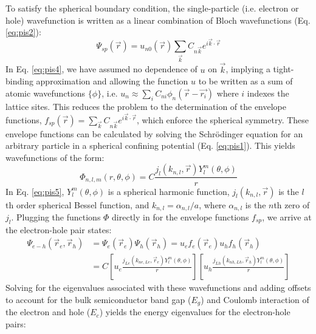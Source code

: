 To satisfy the spherical boundary condition, the single-particle (i.e. electron or hole) wavefunction is written as a linear combination of Bloch wavefunctions (Eq. \ref{eq:pis2}):
\begin{equation}\label{eq:pis4}
\Psi_{sp}\left(\vec{r}\right) = u_{n0}\left(\vec{r}\right)\sum_{\vec{k}}C_{n\vec{k}}e^{i\vec{k}\cdot\vec{r}}
\end{equation}
In Eq. \ref{eq:pis4}, we have assumed no dependence of $u$ on $\vec{k}$, implying a tight-binding approximation and allowing the function $u$ to be written as a sum of atomic wavefunctions $\{\phi\}$, i.e. $u_n \approx \sum_{i} C_{ni}\phi_n\left(\vec{r} - \vec{r_i}\right)$ where $i$ indexes the lattice sites. This reduces the problem to the determination of the envelope functions, $f_{sp}\left(\vec{r}\right) = \sum_{\vec{k}}C_{n\vec{k}}e^{i\vec{k}\cdot\vec{r}}$, which enforce the spherical symmetry. These envelope functions can be calculated by solving the Schr{\"o}dinger equation for an arbitrary particle in a spherical confining potential (Eq. \ref{eq:pis1}). This yields wavefunctions of the form:
\begin{equation}\label{eq:pis5}
\Phi_{n,l,m}\left(r,\theta, \phi\right) = C\frac{j_l\left(k_{n,l},\vec{r}\right)Y_l^m\left(\theta,\phi\right)}{r}
\end{equation}
In Eq. \ref{eq:pis5}, $Y_l^m\left(\theta,\phi\right)$ is a spherical harmonic function, $j_l\left(k_{n,l},\vec{r}\right)$ is the $l$th order spherical Bessel function, and $k_{n,l} = \alpha_{n,l}/a$, where $\alpha_{n,l}$ is the $n$th zero of $j_l$. Plugging the functions $\Phi$ directly in for the envelope functions $f_{sp}$, we arrive at the electron-hole pair states:
\begin{equation}\label{eq:pis6}
\begin{split}
\Psi_{e-h}\left(\vec{r}_e, \vec{r}_h\right) &= \Psi_e\left(\vec{r}_e\right)\Psi_h\left(\vec{r}_h\right) = u_ef_e\left(\vec{r}_e\right)u_hf_h\left(\vec{r}_h\right) \\
&= C\left[u_e\frac{j_{Le}\left(k_{ne,Le},\vec{r}_e\right)Y_l^m\left(\theta,\phi\right)}{r}\right]\left[u_h\frac{j_{Lh}\left(k_{nh,Lh},\vec{r}_h\right)Y_l^m\left(\theta,\phi\right)}{r}\right]
\end{split}
\end{equation}
Solving for the eigenvalues associated with these wavefunctions and adding offsets to account for the bulk semiconductor band gap ($E_g$) and Coulomb interaction of the electron and hole ($E_c$) yields the energy eigenvalues for the electron-hole pairs:
